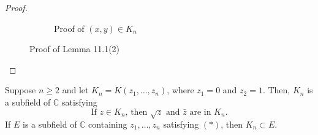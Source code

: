 \documentclass[twoside]{article}
\newcommand\C{\mathbb C}
\theoremstyle{remark}
\begin{document}
\begin{proof}
\begin{figure}[ht]
\begin{subfigure}{5cm}
      \caption{Proof of \((x,y) \in K_n\)}\label{fig:lem11.1(2)b}
    \end{subfigure}
    \caption{Proof of Lemma 11.1(2)}\label{fig:lem11.1(2)}
  \end{figure}
\end{proof}

\begin{proposition}
  Suppose \(n \geq 2\) and let \(K_n = K(z_1, \dots, z_n)\), where \(z_1 = 0\) and \(z_2 = 1\). Then, \(K_n\) is a subfield of \(\C\) satisfying
  \[ \text{If \(z \in K_n\), then \(\sqrt z\) and \(\bar z\) are in \(K_n\).} \tag{\(*\)} \]
  If \(E\) is a subfield of \(\C\) containing \(z_1, \dots, z_n\) satisfying \((*)\), then \(K_n \subset E\).
\end{proposition}
\end{document}
